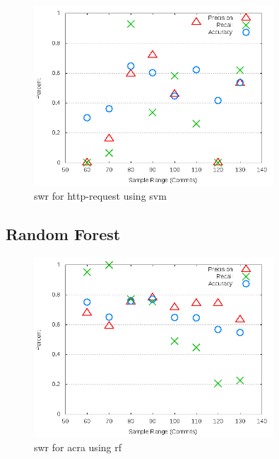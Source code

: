 \begin{figure}[!t]
\centering
\includegraphics[width=0.8\textwidth]{images/svm/test_1/http-request_sample_range.png}
\caption{\gls{swr} for http-request using \gls{svm}}
\label{fig:test_1_http-request_svm}
\end{figure}

\subsection{Random Forest}
\label{app_sub:experiment_1_rf}

\begin{figure}
\centering
\includegraphics[width=0.8\textwidth]{images/rf/test_1/acra_sample_range.png}
\caption{\gls{swr} for acra using \gls{rf}}
\label{fig:test_1_acra_rf}
\end{figure}

